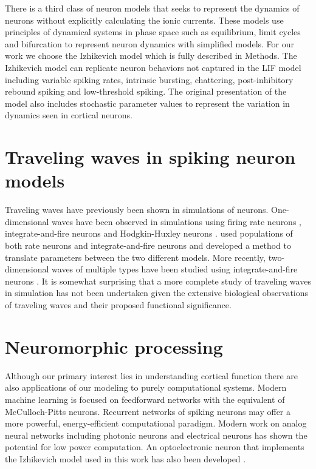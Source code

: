 There is a third class of neuron models that seeks to represent the dynamics of neurons without explicitly calculating the ionic currents.
These models use principles of dynamical systems in phase space such as equilibrium, limit cycles and bifurcation to represent neuron dynamics with simplified models.
For our work we choose the Izhikevich model\citep{izhikevich2003} which is fully described in Methods.
The Izhikevich model can replicate neuron behaviors not captured in the LIF model including variable spiking rates, intrinsic bursting, chattering, post-inhibitory rebound spiking and low-threshold spiking.
The original presentation of the model also includes stochastic parameter values to represent the variation in dynamics seen in cortical neurons.

\section{Traveling waves in spiking neuron models}
Traveling waves have previously been shown in simulations of neurons.
One-dimensional waves have been observed in simulations using firing rate neurons \citep{Roxin2005}, integrate-and-fire neurons \citep{Bressloff1997}\citep{Golomb1999} and Hodgkin-Huxley neurons \citep{Golomb1997}.
\citet{Senk2020} used populations of both rate neurons and integrate-and-fire neurons and developed a method to translate parameters between the two different models.
More recently, two-dimensional waves of multiple types have been studied using integrate-and-fire neurons \citep{Mehring2003}\citep{keane2015}\citep{Keane2018}\citep{Spreizer2019}\citep{Chen2019}.
It is somewhat surprising that a  more complete study of traveling waves in simulation has not been undertaken given the extensive biological observations of traveling waves
and their proposed functional significance.

\section{Neuromorphic processing}
Although our primary interest lies in understanding cortical function there are also applications of our modeling to purely computational systems.
Modern machine learning is focused on feedforward networks with the equivalent of McCulloch-Pitts neurons.
Recurrent networks of spiking neurons may offer a more powerful, energy-efficient computational paradigm.
Modern work on analog neural networks including photonic neurons\citep{Xiang2016}\citep{Coarer2018}\citep{Fok2010} and electrical neurons has shown the potential for low power computation.
An optoelectronic neuron that implements the Izhikevich model used in this work has also been developed \citep{Lee2020}.

